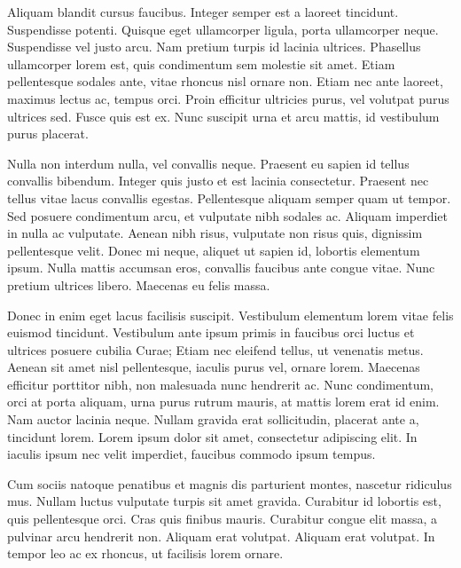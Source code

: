 Aliquam blandit cursus faucibus. Integer semper est a laoreet tincidunt. Suspendisse potenti. Quisque eget ullamcorper ligula, porta ullamcorper neque. Suspendisse vel justo arcu. Nam pretium turpis id lacinia ultrices. Phasellus ullamcorper lorem est, quis condimentum sem molestie sit amet. Etiam pellentesque sodales ante, vitae rhoncus nisl ornare non. Etiam nec ante laoreet, maximus lectus ac, tempus orci. Proin efficitur ultricies purus, vel volutpat purus ultrices sed. Fusce quis est ex. Nunc suscipit urna et arcu mattis, id vestibulum purus placerat.

Nulla non interdum nulla, vel convallis neque. Praesent eu sapien id tellus convallis bibendum. Integer quis justo et est lacinia consectetur. Praesent nec tellus vitae lacus convallis egestas. Pellentesque aliquam semper quam ut tempor. Sed posuere condimentum arcu, et vulputate nibh sodales ac. Aliquam imperdiet in nulla ac vulputate. Aenean nibh risus, vulputate non risus quis, dignissim pellentesque velit. Donec mi neque, aliquet ut sapien id, lobortis elementum ipsum. Nulla mattis accumsan eros, convallis faucibus ante congue vitae. Nunc pretium ultrices libero. Maecenas eu felis massa.

Donec in enim eget lacus facilisis suscipit. Vestibulum elementum lorem vitae felis euismod tincidunt. Vestibulum ante ipsum primis in faucibus orci luctus et ultrices posuere cubilia Curae; Etiam nec eleifend tellus, ut venenatis metus. Aenean sit amet nisl pellentesque, iaculis purus vel, ornare lorem. Maecenas efficitur porttitor nibh, non malesuada nunc hendrerit ac. Nunc condimentum, orci at porta aliquam, urna purus rutrum mauris, at mattis lorem erat id enim. Nam auctor lacinia neque. Nullam gravida erat sollicitudin, placerat ante a, tincidunt lorem. Lorem ipsum dolor sit amet, consectetur adipiscing elit. In iaculis ipsum nec velit imperdiet, faucibus commodo ipsum tempus.

Cum sociis natoque penatibus et magnis dis parturient montes, nascetur ridiculus mus. Nullam luctus vulputate turpis sit amet gravida. Curabitur id lobortis est, quis pellentesque orci. Cras quis finibus mauris. Curabitur congue elit massa, a pulvinar arcu hendrerit non. Aliquam erat volutpat. Aliquam erat volutpat. In tempor leo ac ex rhoncus, ut facilisis lorem ornare.
